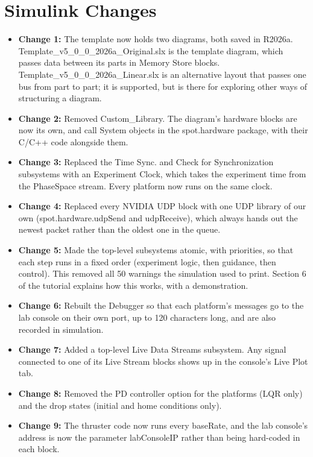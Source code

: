 \documentclass[11pt]{article}
\begin{document}
\section*{\textcolor{primaryColor}{Simulink Changes}}
\begin{itemize}[label={\textcolor{primaryColor}{\textbullet}}]
    \item \textbf{Change 1:} The template now holds two diagrams, both saved in R2026a. Template\_v5\_0\_0\_2026a\_\allowbreak Original.slx is the template diagram, which passes data between its parts in Memory Store blocks. Template\_v5\_0\_0\_2026a\_\allowbreak Linear.slx is an alternative layout that passes one bus from part to part; it is supported, but is there for exploring other ways of structuring a diagram.
    \item \textbf{Change 2:} Removed Custom\_Library. The diagram's hardware blocks are now its own, and call System objects in the spot.hardware package, with their C/C++ code alongside them.
    \item \textbf{Change 3:} Replaced the Time Sync. and Check for Synchronization subsystems with an Experiment Clock, which takes the experiment time from the PhaseSpace stream. Every platform now runs on the same clock.
    \item \textbf{Change 4:} Replaced every NVIDIA UDP block with one UDP library of our own (spot.hardware.udpSend and udpReceive), which always hands out the newest packet rather than the oldest one in the queue.
    \item \textbf{Change 5:} Made the top-level subsystems atomic, with priorities, so that each step runs in a fixed order (experiment logic, then guidance, then control). This removed all 50 warnings the simulation used to print. Section 6 of the tutorial explains how this works, with a demonstration.
    \item \textbf{Change 6:} Rebuilt the Debugger so that each platform's messages go to the lab console on their own port, up to 120 characters long, and are also recorded in simulation.
    \item \textbf{Change 7:} Added a top-level Live Data Streams subsystem. Any signal connected to one of its Live Stream blocks shows up in the console's Live Plot tab.
    \item \textbf{Change 8:} Removed the PD controller option for the platforms (LQR only) and the drop states (initial and home conditions only).
    \item \textbf{Change 9:} The thruster code now runs every baseRate, and the lab console's address is now the parameter labConsoleIP rather than being hard-coded in each block.

\end{itemize}
\end{document}
